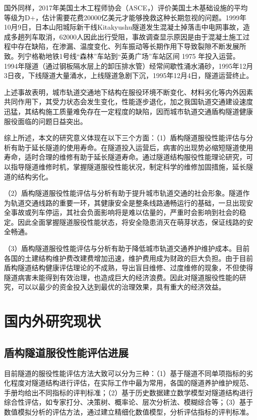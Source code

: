 国外同样，2017年美国土木工程师协会（ASCE，\citeyear{ASCE2017}）评价美国土木基础设施的平均等级为D+，估计需要花费20000亿美元才能够挽救这种长期忽视的问题。1999年10月9日，日本山阳城际新干线Kitakyushu隧道发生混凝土掉落击中电网事故，造成多趟列车取消，62000人因此出行受阻，事故调查显示原因是由于混凝土施工过程中存在缺陷，在渗漏、温度变化、列车振动等长期作用下导致裂隙不断发展所致。列宁格勒地铁1号线“森林”车站到“英勇广场”车站区间 1975 年投入运营。1994年隧道（通过钢板隔水层上的卸压排水管）经常间歇性涌水涌砂，1995年12月3日夜，下线隧道大量涌水，上线隧道急剧下沉，1995年12月4日，隧道运营终止。

上述事故表明，城市轨道交通地下结构在服役环境不断变化、材料劣化等内外因素共同作用下，其受力状态会发生变化，性能逐步退化，加之我国轨道交通建设速度迅猛，其结构施工质量难免存在一定程度的缺陷，因而城市轨道交通盾构隧道健康服役面临的问题日益突出。

综上所述，本文的研究意义体现在以下三个方面：（1）盾构隧道服役性能评估与分析有助于延长隧道的使用寿命。在隧道投入运营后，病害的出现势必缩短隧道使用寿命，适时合理的维修有助于延长隧道寿命。通过隧道结构服役性能理论研究，可以指导隧道维修时机，掌握隧道服役性能状况，制定科学的维修加固措施，延长隧道的结构劣化。

（2）盾构隧道服役性能评估与分析有助于提升城市轨道交通的社会形象。隧道作为轨道交通线路的重要一环，其健康安全是整条线路通畅运行的基础，一旦出现安全事故或列车停运，其社会负面影响将是难以估量的，严重时会影响到社会的稳定。因此全面掌握隧道服役性能状态，将安全隐患消灭在萌芽状态，保证线路的安全畅通。

（3）盾构隧道服役性能评估与分析有助于降低城市轨道交通养护维护成本。目前各国的土建结构维护费改建费增加迅速，维护费用成为财政的巨大负担。由于目前盾构隧道结构健康评估理论的不成熟，导出盲目维修、过度维修的现象，不但使得隧道病害未能得到有效治理，也造成巨大的经济浪费。因此对隧道服役性能的研究，可以以最少的资金投入达到最优的治理效果，具有重大的经济效益。

\section{国内外研究现状}
\subsection{盾构隧道服役性能评估进展}

目前隧道的服役性能评估方法大致可以分为三种：（1）基于隧道不同单项指标的劣化程度对隧道结构进行评估，在实际工作中最为常用，各国的隧道养护维护规范、手册均给出不同指标的评判标准；（2）基于历史数据建立数学模型对隧道结构进行综合性评估，如专家打分、决策树、概率论、层次分析法、模糊综合等；（3）基于数值模拟分析的评估方法，通过建立精细化数值模型，分析评估指标的评判标准。

